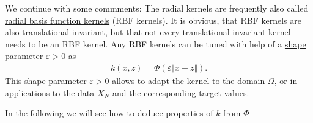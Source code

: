 We continue with some commments:
The radial kernels are frequently also called \underline{radial basis function kernels} (RBF kernels).
It is obvious, that RBF kernels are also translational invariant,
but that not every translational invariant kernel needs to be an RBF kernel.
Any RBF kernels can be tuned with help of a \underline{shape parameter} $\varepsilon > 0$ as
\begin{align*}
k(x, z) = \Phi(\varepsilon \Vert x - z \Vert).
\end{align*}
This shape parameter $\varepsilon > 0$ allows to adapt the kernel to the domain $\Omega$,
or in applications to the data $X_N$ and the corresponding target values.

In the following we will see how to deduce properties of $k$ from $\Phi$



%
%




